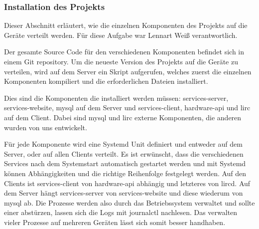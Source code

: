\subsubsection{Installation des Projekts}

Dieser Abschnitt erläutert, wie die einzelnen Komponenten des Projekts auf die Geräte verteilt
werden.
Für diese Aufgabe war Lennart Weiß verantwortlich.

Der gesamte Source Code für den verschiedenen Komponenten befindet sich in einem Git repository.
Um die neueste Version des Projekts auf die Geräte zu verteilen, wird auf dem Server ein Skript
aufgerufen, welches zuerst die einzelnen Komponenten kompiliert und die erforderlichen Dateien
installiert.

Dies sind die Komponenten die installiert werden müssen: services-server, services-website, mysql
auf dem Server und services-client, hardware-api und lirc auf dem Client.
Dabei sind mysql und lirc externe Komponenten, die anderen wurden von uns entwickelt.

Für jede Komponente wird eine Systemd Unit definiert und entweder auf dem Server, oder auf allen
Clients verteilt.
Es ist erwünscht, dass die verschiedenen Services nach dem Systemstart automatisch gestartet werden
und mit Systemd können Abhängigkeiten und die richtige Reihenfolge festgelegt werden.
Auf den Clients ist services-client von hardware-api abhängig und letzteres von lircd.
Auf dem Server hängt services-server von services-website und diese wiederum von mysql ab.
Die Prozesse werden also durch das Betriebssystem verwaltet und sollte einer abstürzen, lassen sich
die Logs mit journalctl nachlesen.
Das verwalten vieler Prozesse auf mehreren Geräten lässt sich somit besser handhaben.

